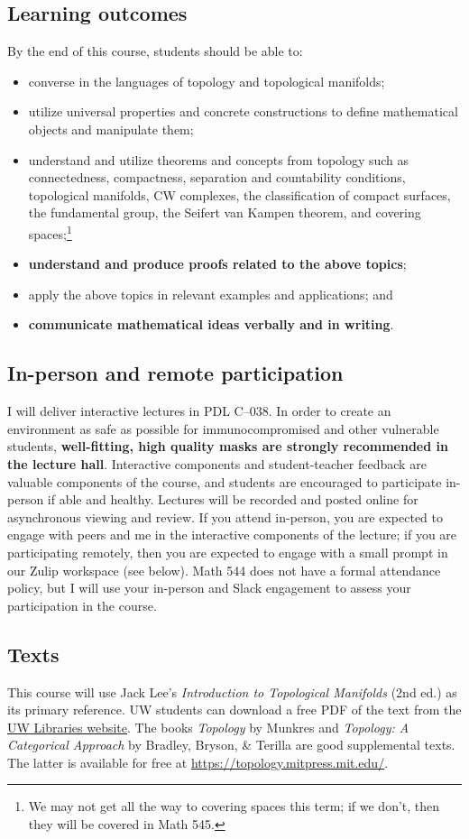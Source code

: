 \documentclass[11pt,twoside]{amsart}
\begin{document}
\subsection*{Learning outcomes}
By the end of this course, students should be able to:
\begin{itemize}
\item converse in the languages of topology and topological manifolds;
\item utilize universal properties and concrete constructions to define mathematical objects and manipulate them;
\item understand and utilize theorems and concepts from topology such as connectedness, compactness, separation and countability conditions, topological manifolds, CW complexes, the classification of compact surfaces, the fundamental group, the Seifert van Kampen theorem, and covering spaces;\footnote{We may not get all the way to covering spaces this term; if we don't, then they will be covered in Math 545.}
\item \textbf{understand and produce proofs related to the above topics};
\item apply the above topics in relevant examples and applications; and
\item \textbf{communicate mathematical ideas verbally and in writing}.
\end{itemize}

\subsection*{In-person and remote participation}
I will deliver interactive lectures in PDL C--038. In order to create an environment as safe as possible for immunocompromised and other vulnerable students, \textbf{well-fitting, high quality masks are strongly recommended in the lecture hall}.  Interactive components and student-teacher feedback are valuable components of the course, and students are encouraged to participate in-person if able and healthy. Lectures will be recorded and posted online for asynchronous viewing and review.  If you attend in-person, you are expected to engage with peers and me in the interactive components of the lecture; if you are participating remotely, then you are expected to engage with a small prompt in our Zulip workspace (see below). Math 544 does not have a formal attendance policy, but I will use your in-person and Slack engagement to assess your participation in the course.

\subsection*{Texts}
This course will use Jack Lee's \emph{Introduction to Topological Manifolds} (2nd ed.) as its primary reference. UW students can download a free PDF of the text from the \href{https://link-springer-com.offcampus.lib.washington.edu/book/10.1007/978-1-4419-7940-7}{UW Libraries website}. The books \emph{Topology} by Munkres and \emph{Topology: A Categorical Approach} by Bradley, Bryson, \& Terilla are good supplemental texts. The latter is available for free at \url{https://topology.mitpress.mit.edu/}.
\end{document}
